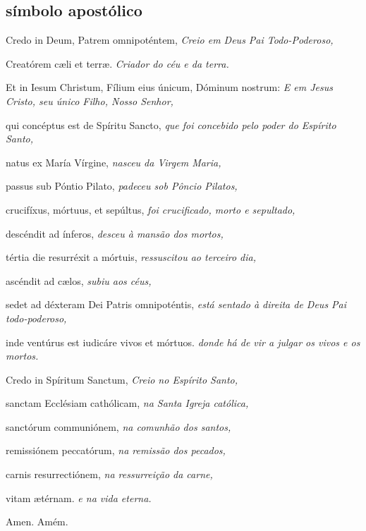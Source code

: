 \subsection{símbolo apostólico}

\begin{paracol}{2}
  Credo in Deum, Patrem omnipoténtem,
  \switchcolumn
  \emph{Creio em Deus Pai Todo-Poderoso,}
  \switchcolumn*

  Creatórem c{\ae}li et terr{\ae}.
  \switchcolumn
  \emph{Criador do céu e da terra.}
  \switchcolumn*

  Et in Iesum Christum, Fílium eius únicum, Dóminum nostrum:
  \switchcolumn
  \emph{E em Jesus Cristo, seu único Filho, Nosso Senhor,}
  \switchcolumn*

  qui concéptus est de Spíritu Sancto,
  \switchcolumn
  \emph{que foi concebido pelo poder do Espírito Santo,}
  \switchcolumn*

  natus ex María Vírgine,
  \switchcolumn
  \emph{nasceu da Virgem Maria,}
  \switchcolumn*

  passus sub Póntio Pilato,
  \switchcolumn
  \emph{padeceu sob Pôncio Pilatos,}
  \switchcolumn*

  crucifíxus, mórtuus, et sepúltus,
  \switchcolumn
  \emph{foi crucificado, morto e sepultado,}
  \switchcolumn*

  descéndit ad ínferos,
  \switchcolumn
  \emph{desceu à mansão dos mortos,}
  \switchcolumn*

  tértia die resurréxit a mórtuis,
  \switchcolumn
  \emph{ressuscitou ao terceiro dia,}
  \switchcolumn*

  ascéndit ad c{\ae}los,
  \switchcolumn
  \emph{subiu aos céus,}
  \switchcolumn*

  sedet ad déxteram Dei Patris omnipoténtis,
  \switchcolumn
  \emph{está sentado à direita de Deus Pai todo-poderoso,}
  \switchcolumn*

  inde ventúrus est iudicáre vivos et mórtuos.
  \switchcolumn
  \emph{donde há de vir a julgar os vivos e os mortos.}
  \switchcolumn*

  Credo in Spíritum Sanctum,
  \switchcolumn
  \emph{Creio no Espírito Santo,}
  \switchcolumn*

  sanctam Ecclésiam cathólicam,
  \switchcolumn
  \emph{na Santa Igreja católica,}
  \switchcolumn*

  sanctórum communiónem,
  \switchcolumn
  \emph{na comunhão dos santos,}
  \switchcolumn*

  remissiónem peccatórum,
  \switchcolumn
  \emph{na remissão dos pecados,}
  \switchcolumn*

  carnis resurrectiónem,
  \switchcolumn
  \emph{na ressurreição da carne,}
  \switchcolumn*

  vitam {\ae}térnam.
  \switchcolumn
  \emph{e na vida eterna.}
  \switchcolumn*

  Amen.
  \switchcolumn
  Amém.
\end{paracol}

